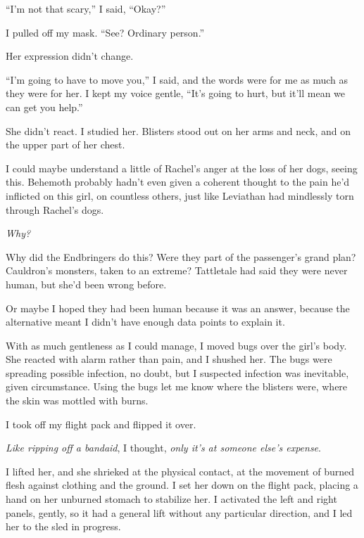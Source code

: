 ``I'm not that scary,'' I said, ``Okay?''



I pulled off my mask.  ``See?  Ordinary person.''



Her expression didn't change.



``I'm going to have to move you,'' I said, and the words were for me as much as they were for her.  I kept my voice gentle, ``It's going to hurt, but it'll mean we can get you help.''



She didn't react.  I studied her.  Blisters stood out on her arms and neck, and on the upper part of her chest.



I could maybe understand a little of Rachel's anger at the loss of her dogs, seeing this.  Behemoth probably hadn't even given a coherent thought to the pain he'd inflicted on this girl, on countless others, just like Leviathan had mindlessly torn through Rachel's dogs.



\emph{Why?}



Why did the Endbringers do this?  Were they part of the passenger's grand plan?  Cauldron's monsters, taken to an extreme?  Tattletale had said they were never human, but she'd been wrong before.



Or maybe I hoped they had been human because it was an answer, because the alternative meant I didn't have enough data points to explain it.



With as much gentleness as I could manage, I moved bugs over the girl's body.  She reacted with alarm rather than pain, and I shushed her.  The bugs were spreading possible infection, no doubt, but I suspected infection was inevitable, given circumstance.  Using the bugs let me know where the blisters were, where the skin was mottled with burns.



I took off my flight pack and flipped it over.



\emph{Like ripping off a bandaid}, I thought, \emph{only it's at someone else's expense}.



I lifted her, and she shrieked at the physical contact, at the movement of burned flesh against clothing and the ground.  I set her down on the flight pack, placing a hand on her unburned stomach to stabilize her.  I activated the left and right panels, gently, so it had a general lift without any particular direction, and I led her to the sled in progress.




